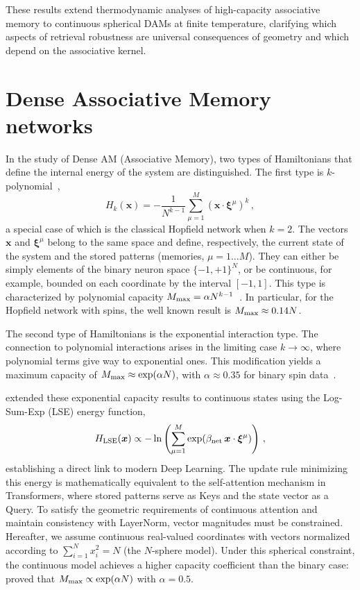 \documentclass{article}
\theoremstyle{plain}
\theoremstyle{definition}
\theoremstyle{remark}
\begin{document}
These results extend thermodynamic analyses of high-capacity associative memory to continuous spherical DAMs at finite temperature, clarifying which aspects of retrieval robustness are universal consequences of geometry and which depend on the associative kernel.






\section{Dense Associative Memory networks}

In the study of Dense AM (Associative Memory), two types of Hamiltonians that define the internal energy of the system are distinguished. The first type is $k$-polynomial~\cite{krotov2016dense}, 
\begin{equation}
    H_k(\bm{x}) = - \frac{1}{N^{k-1}} \sum\limits_{\mu=1}^{M} (\bm{x} \cdot \bm{\xi}^\mu)^k\,,
    \label{eq:H_k}
\end{equation}
a special case of which is the classical Hopfield network \cite{Hopfield1982} when $k=2$. 
The vectors $\bm{x}$ and $\bm{\xi}^\mu$ belong to the same space and define, respectively, the current state of the system and the stored patterns (memories, $\mu=1\dots M$). They can either be simply elements of the binary neuron space $\{-1,+1\}^N$, or be continuous, for example, bounded on each coordinate by the interval $[-1, 1]$. This type is characterized by polynomial capacity $M_{\rm max} = \alpha N^{k-1}$~\cite{krotov2016dense}. In particular, for the Hopfield network with spins, the well known result is $M_{\rm max} \approx 0.14N$.

The second type of Hamiltonians is the exponential interaction type. The connection to polynomial interactions arises in the limiting case $k \to \infty$, where polynomial terms give way to exponential ones. This modification yields a maximum capacity of $M_{\rm max} \approx \exp(\alpha N)$, with $\alpha \approx 0.35$ for binary spin data~\cite{demircigil2017model}.

\citet{ramsauer2021hopfield} extended these exponential capacity results to continuous states using the Log-Sum-Exp (LSE) energy function, 
\begin{equation}
    H_{\rm LSE}(\bm{x}) \propto -\ln \left( \sum_{\mu=1}^M \exp(\beta_{\rm net} \, \bm{x} \cdot \bm{\xi}^\mu) \right) \,,
    \label{eq:lse_energy}
\end{equation}
establishing a direct link to modern Deep Learning.
The update rule minimizing this energy is mathematically equivalent to the self-attention mechanism in Transformers, where stored patterns serve as Keys and the state vector as a Query. To satisfy the geometric requirements of continuous attention and maintain consistency with LayerNorm, vector magnitudes must be constrained. Hereafter, we assume continuous real-valued coordinates with vectors normalized according to $\sum_{i=1}^{N} x_i^2 = N$ (the $N$-sphere model). Under this spherical constraint, the continuous model achieves a higher capacity coefficient than the binary case: \citet{ramsauer2021hopfield} proved that $M_{\rm max} \propto \exp(\alpha N)$ with $\alpha = 0.5$.
\end{document}
